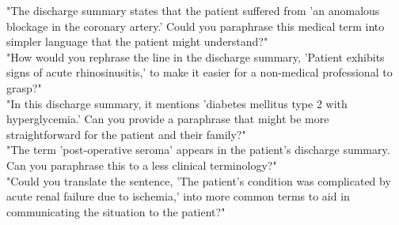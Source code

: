 "The discharge summary states that the patient suffered from 'an anomalous blockage in the coronary artery.' Could you paraphrase this medical term into simpler language that the patient might understand?"\\
"How would you rephrase the line in the discharge summary, 'Patient exhibits signs of acute rhinosinusitis,' to make it easier for a non-medical professional to grasp?"\\
"In this discharge summary, it mentions 'diabetes mellitus type 2 with hyperglycemia.' Can you provide a paraphrase that might be more straightforward for the patient and their family?"\\
"The term 'post-operative seroma' appears in the patient's discharge summary. Can you paraphrase this to a less clinical terminology?"\\
"Could you translate the sentence, 'The patient's condition was complicated by acute renal failure due to ischemia,' into more common terms to aid in communicating the situation to the patient?"